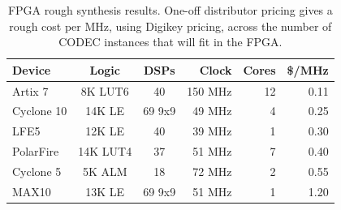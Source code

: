 \begin{table}[t]\centering
	\label{tab:FPGAfit}
	\caption{FPGA rough synthesis results. One-off distributor pricing gives a 
	rough cost per MHz, using Digikey pricing, across the number of CODEC 
	instances that will fit in the FPGA.}
	\centering
	\begin{tabular}{lccrrr}
		\hline\hline
		Device & Logic & DSPs & Clock & Cores & \$/MHz\\ [0.5ex]
		\hline
        Artix 7   & 8K LUT6 & 40   & 150 MHz & 12 & 0.11\\
		Cyclone 10& 14K LE & 69 9x9 & 49 MHz &  4 & 0.25\\
		LFE5      & 12K LE & 40     & 39 MHz &  1 & 0.30\\
        PolarFire & 14K LUT4 & 37   & 51 MHz &  7 & 0.40\\
		Cyclone 5 & 5K ALM & 18     & 72 MHz &  2 & 0.55\\
		MAX10     & 13K LE & 69 9x9 & 51 MHz &  1 & 1.20\\
		\hline
	\end{tabular}
\end{table}

